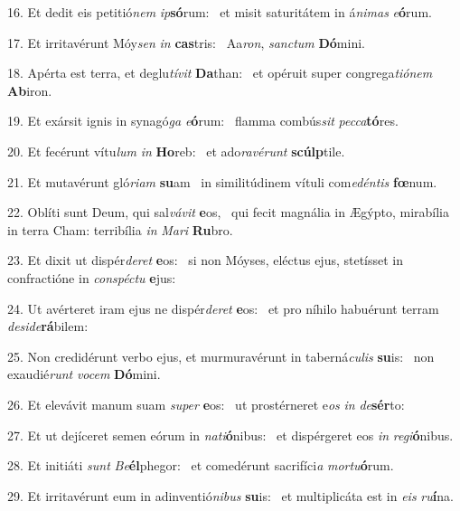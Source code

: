 16. Et dedit eis petitió\textit{nem} \textit{ip}\textbf{só}rum: \ast\  et misit saturitátem in á\textit{ni}\textit{mas} \textit{e}\textbf{ó}rum.\

17. Et irritavérunt Móy\textit{sen} \textit{in} \textbf{cas}tris: \ast\  Aa\textit{ron}, \textit{sanc}\textit{tum} \textbf{Dó}mini.\

18. Apérta est terra, et deglu\textit{tí}\textit{vit} \textbf{Da}than: \ast\  et opéruit super congrega\textit{ti}\textit{ó}\textit{nem} \textbf{Ab}iron.\

19. Et exársit ignis in synagó\textit{ga} \textit{e}\textbf{ó}rum: \ast\  flamma combús\textit{sit} \textit{pec}\textit{ca}\textbf{tó}res.\

20. Et fecérunt vítu\textit{lum} \textit{in} \textbf{Ho}reb: \ast\  et ado\textit{ra}\textit{vé}\textit{runt} \textbf{scúlp}tile.\

21. Et mutavérunt gló\textit{ri}\textit{am} \textbf{su}am \ast\  in similitúdinem vítuli com\textit{e}\textit{dén}\textit{tis} \textbf{fœ}num.\

22. Oblíti sunt Deum, qui sal\textit{vá}\textit{vit} \textbf{e}os, \ast\  qui fecit magnália in Ægýpto, mirabília in terra Cham: terribília \textit{in} \textit{Ma}\textit{ri} \textbf{Ru}bro.\

23. Et dixit ut dispér\textit{de}\textit{ret} \textbf{e}os: \ast\  si non Móyses, eléctus ejus, stetísset in confractióne in \textit{con}\textit{spéc}\textit{tu} \textbf{e}jus:\

24. Ut avérteret iram ejus ne dispér\textit{de}\textit{ret} \textbf{e}os: \ast\  et pro níhilo habuérunt terram \textit{de}\textit{si}\textit{de}\textbf{rá}bilem:\

25. Non credidérunt verbo ejus, et murmuravérunt in taberná\textit{cu}\textit{lis} \textbf{su}is: \ast\  non exaudié\textit{runt} \textit{vo}\textit{cem} \textbf{Dó}mini.\

26. Et elevávit manum suam \textit{su}\textit{per} \textbf{e}os: \ast\  ut prostérneret e\textit{os} \textit{in} \textit{de}\textbf{sér}to:\

27. Et ut dejíceret semen eórum in \textit{na}\textit{ti}\textbf{ó}nibus: \ast\  et dispérgeret eos \textit{in} \textit{re}\textit{gi}\textbf{ó}nibus.\

28. Et initiáti \textit{sunt} \textit{Be}\textbf{él}phegor: \ast\  et comedérunt sacrifíci\textit{a} \textit{mor}\textit{tu}\textbf{ó}rum.\

29. Et irritavérunt eum in adinventió\textit{ni}\textit{bus} \textbf{su}is: \ast\  et multiplicáta est in \textit{e}\textit{is} \textit{ru}\textbf{í}na.\

